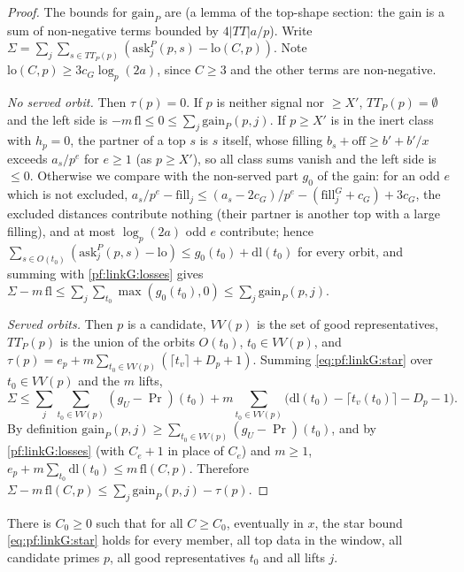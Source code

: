 \begin{proof}
The bounds for $\mathrm{gain}_P$ are  (a lemma of the top-shape section:
the gain is a sum of non-negative terms bounded by $4|TT|a/p$). Write $\Sigma=\sum_j\sum_{s\in TT_P(p)}(\mathrm{ask}^P_j(p,s)-\mathrm{lo}(C,p))$.
Note $\mathrm{lo}(C,p)\ge3c_G\log_p(2a)$, since $C\ge3$ and the other terms are non-negative.

\emph{No served orbit.} Then $\tau(p)=0$. If $p$ is neither signal nor $\ge X'$, $TT_P(p)=\emptyset$ and the left side is
$-m\,\mathrm{fl}\le0\le\sum_j\mathrm{gain}_P(p,j)$. If $p\ge X'$ is in the inert class with $h_p=0$, the partner of a top $s$ is $s$ itself, whose filling
$b_s+\mathrm{off}\ge b'+b'/x$ exceeds $a_s/p^e$ for $e\ge1$ (as $p\ge X'$), so all class sums vanish and the left side is $\le0$. Otherwise we compare with the non-served part $g_0$ of the gain: for an odd $e$ which is not excluded,
$a_s/p^e-\mathrm{fill}_j\le(a_s-2c_G)/p^e-(\mathrm{fill}^G_j+c_G)+3c_G$, the excluded distances contribute nothing (their partner is
another top with a large filling), and at most $\log_p(2a)$ odd $e$ contribute; hence
$\sum_{s\in O(t_0)}(\mathrm{ask}^P_j(p,s)-\mathrm{lo})\le g_0(t_0)+\mathrm{dl}(t_0)$ for every orbit, and summing with \cref{pf:linkG:losses}
gives $\Sigma-m\,\mathrm{fl}\le\sum_j\sum_{t_0}\max(g_0(t_0),0)\le\sum_j\mathrm{gain}_P(p,j)$.

\emph{Served orbits.} Then $p$ is a candidate, $VV(p)$ is the set of good representatives, $TT_P(p)$ is the union of the orbits
$O(t_0)$, $t_0\in VV(p)$, and $\tau(p)=e_p+m\sum_{t_0\in VV(p)}(\lceil t_v\rceil+D_p+1)$. Summing \eqref{eq:pf:linkG:star} over
$t_0\in VV(p)$ and the $m$ lifts,
\[
\Sigma\le\sum_j\sum_{t_0\in VV(p)}(g_U-\Pr)(t_0)+m\sum_{t_0\in VV(p)}\bigl(\mathrm{dl}(t_0)-\lceil t_v(t_0)\rceil-D_p-1\bigr).
\]
By definition $\mathrm{gain}_P(p,j)\ge\sum_{t_0\in VV(p)}(g_U-\Pr)(t_0)$, and by \cref{pf:linkG:losses} (with $C_e+1$ in place of $C_e$)
and $m\ge1$, $e_p+m\sum_{t_0}\mathrm{dl}(t_0)\le m\,\mathrm{fl}(C,p)$. Therefore $\Sigma-m\,\mathrm{fl}(C,p)\le\sum_j\mathrm{gain}_P(p,j)-\tau(p)$.
\end{proof}

\begin{theorem}\label{pf:linkG:starbounds}
There is $C_0\ge0$ such that for all $C\ge C_0$, eventually in $x$, the star bound \eqref{eq:pf:linkG:star} holds for every member,
all top data in the window, all candidate primes $p$, all good representatives $t_0$ and all lifts $j$.
\end{theorem}

